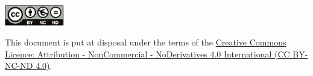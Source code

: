 $~$

\vfill

\vspace{2cm}

\begin{center}
	\begin{minipage}[c]{0.25\linewidth}
		\raggedright\includegraphics[height=35px]{Figs/by-nc-nd-eu.pdf}
	\end{minipage}\hfill
\end{center}

\noindent This document is put at disposal under the terms of the \href{https://creativecommons.org/licenses/by-nc-nd/4.0/}{Creative Commons Licence: Attribution - NonCommercial - NoDerivatives 4.0 International (CC BY-NC-ND 4.0)}. 